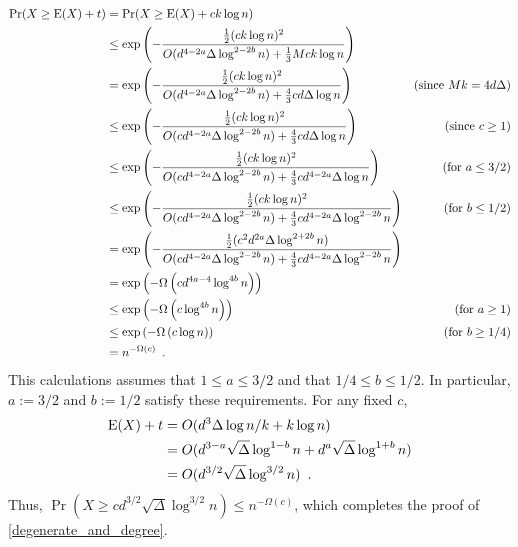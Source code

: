\documentclass{patmorin}
\begin{document}
\begin{align*}
  \Pr(X\ge \mathrm{E}(X)+t)
  & = \Pr(X\ge \mathrm{E}(X)+ck\log n) \\
  & \le \exp \left(-\frac{\tfrac{1}{2}(ck\log n)^2}{O(d^{4-2a}\Delta\log^{2-2b}n) + \tfrac{1}{3}Mck\log n}\right) \\
  & = \exp \left(-\frac{\tfrac{1}{2}(ck\log n)^2}{O(d^{4-2a}\Delta\log^{2-2b}n) + \tfrac{4}{3}cd\Delta\log n}\right)
    & \text{(since $Mk=4d\Delta$)} \\
  & \le \exp \left(-\frac{\tfrac{1}{2}(ck\log n)^2}{O(cd^{4-2a}\Delta\log^{2-2b}n) + \tfrac{4}{3}cd\Delta\log n}\right)
  & \text{(since $c\ge 1$)}\\
  & \le \exp \left(-\frac{\tfrac{1}{2}(ck\log n)^2}{O(cd^{4-2a}\Delta\log^{2-2b}n) + \tfrac{4}{3}cd^{4-2a}\Delta\log n}\right)
  & \text{(for $a\le 3/2$)}\\
  & \le \exp \left(-\frac{\tfrac{1}{2}(ck\log n)^2}{O(cd^{4-2a}\Delta\log^{2-2b}n) + \tfrac{4}{3}cd^{4-2a}\Delta\log^{2-2b}n}\right)
  & \text{(for $b\le 1/2$)}\\
  & = \exp \left(-\frac{\tfrac{1}{2}(c^2d^{2a}\Delta\log^{2+2b} n)}{O(cd^{4-2a}\Delta\log^{2-2b}n) + \tfrac{4}{3}cd^{4-2a}\Delta\log^{2-2b}n}\right) \\
  & = \exp \left(-\Omega\left(cd^{4a-4}\log^{4b}n\right)\right) \\
  & \le \exp \left(-\Omega\left(c\log^{4b}n\right)\right)
  & \text{(for $a\ge 1$)}\\
  & \le \exp \left(-\Omega\left(c\log n\right)\right)
  & \text{(for $b\ge 1/4$)}\\
  & = n^{-\Omega(c)} \enspace .
\end{align*}
This calculations assumes that $1\le a\le 3/2$ and that $1/4\le b\le 1/2$.  In particular, $a:=3/2$ and $b:=1/2$ satisfy these requirements.  For any fixed $c$,
\begin{align*}
  \mathrm{E}(X)+t
    & = O(d^3\Delta\log n/k + k\log n) \\
    & = O(d^{3-a}\sqrt{\Delta}\log^{1-b} n + d^a\sqrt{\Delta}\log^{1+b} n) \\
    & = O(d^{3/2}\sqrt{\Delta}\log^{3/2}n) \enspace .
\end{align*}
Thus, $\Pr(X\ge cd^{3/2}\sqrt{\Delta}\log^{3/2} n) \le n^{-\Omega(c)}$, which completes the proof of \cref{degenerate_and_degree}.
\end{document}
